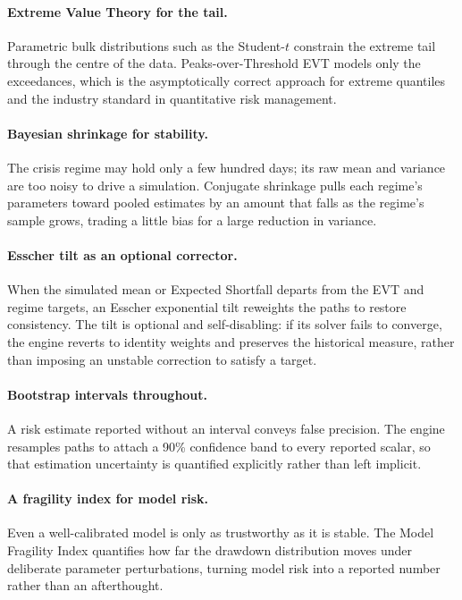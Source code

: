 \documentclass[11pt]{article}
\theoremstyle{definition}
\begin{document}
\paragraph{Extreme Value Theory for the tail.}
Parametric bulk distributions such as the Student-$t$ constrain the extreme tail
through the centre of the data. Peaks-over-Threshold EVT models only the
exceedances, which is the asymptotically correct approach for extreme quantiles
and the industry standard in quantitative risk management.

\paragraph{Bayesian shrinkage for stability.}
The crisis regime may hold only a few hundred days; its raw mean and variance
are too noisy to drive a simulation. Conjugate shrinkage pulls each regime's
parameters toward pooled estimates by an amount that falls as the regime's
sample grows, trading a little bias for a large reduction in variance.

\paragraph{Esscher tilt as an optional corrector.}
When the simulated mean or Expected Shortfall departs from the EVT and regime
targets, an Esscher exponential tilt reweights the paths to restore consistency.
The tilt is optional and self-disabling: if its solver fails to converge, the
engine reverts to identity weights and preserves the historical measure, rather
than imposing an unstable correction to satisfy a target.

\paragraph{Bootstrap intervals throughout.}
A risk estimate reported without an interval conveys false precision. The engine
resamples paths to attach a 90\% confidence band to every reported scalar, so that
estimation uncertainty is quantified explicitly rather than left implicit.

\paragraph{A fragility index for model risk.}
Even a well-calibrated model is only as trustworthy as it is stable. The Model
Fragility Index quantifies how far the drawdown distribution moves under
deliberate parameter perturbations, turning model risk into a reported number
rather than an afterthought.
\end{document}
